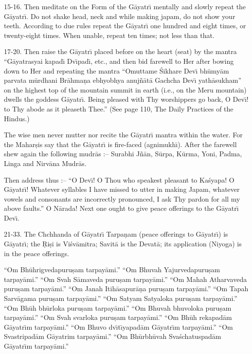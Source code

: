 15-16. Then meditate on the Form of the G\=ayatr\={\i} mentally and slowly repeat the G\=ayatr\={\i}. Do not shake head, neck and while making japam, do not show your teeth. According to due rules repeat the G\=ayatr\={\i} one hundred and eight times, or twenty-eight times. When unable, repeat ten times; not less than that.

17-20. Then raise the G\=ayatr\={\i} placed before on the heart (seat) by the mantra ``G\=ayatrasyai kapad\={\i} Dv\={\i}pad\={\i}, etc., and then bid farewell to Her after bowing down to Her and repeating the mantra ``Omuttame \'Sikhare Dev\={\i} bh\=umy\=am parvata m\=urdhani Br\=ahma\d{n}a ebhyobhya anuj\~n\=at\=a Gachcha Dev\={\i} yath\=asukham'' on the highest top of the mountain summit in earth (i.e., on the Meru mountain) dwells the goddess G\=ayatr\={\i}. Being pleased with Thy worshippers go back, O Dev\={\i}! to Thy abode as it pleaseth Thee.'' (See page 110, The Daily Practices of the Hindus.)

The wise men never mutter nor recite the G\=ayatr\={\i} mantra within the water. For the Mahar\d{s}is say that the G\=ayatr\={\i} is fire-faced (agnimukh\={\i}). After the farewell shew again the following mudr\=as :-- Surabhi J\~n\=an, S\=urpa, K\=urma, Yoni, Padma, Linga and Nirv\=ana Mudr\=as.

Then address thus :-- ``O Dev\={\i}! O Thou who speakest pleasant to Ka\'syapa! O G\=ayatr\={\i}! Whatever syllables I have missed to utter in making Japam, whatever vowels and consonants are incorrectly pronounced, I ask Thy pardon for all my above faults.'' O N\=arada! Next one ought to give peace offerings to the G\=ayatr\={\i} Dev\={\i}.

21-33. The Chchhanda of G\=ayatr\={\i} Tarpa\d{n}am (peace offerings to G\=ayatr\={\i}) is G\=ayatr\={\i}; the \d{R}i\d{s}i is Vi\'sv\=amitra; Savit\=a is the Devat\=a; its application (Niyoga) is in the peace offerings.

``Om Bh\=uhrigvedapuru\d{s}am tarpay\=ami.''
``Om Bhuvah Yajurvedapuru\d{s}am tarpay\=ami.''
``Om Svah S\=amaveda puru\d{s}am tarpay\=ami.''
``Om Mahah Atharvaveda puru\d{s}am tarpay\=ami.''
``Om Janah Itih\=asapur\=a\d{n}a puru\d{s}am tarpay\=ami.''
``Om Tapah Sarv\=agama puru\d{s}am tarpay\=ami.''
``Om Satyam Satyaloka puru\d{s}am tarpay\=ami.''
``Om Bh\=uh bh\=urloka puru\d{s}am tarpay\=ami.''
``Om Bhuvah bhuvoloka puru\d{s}am tarpay\=ami.''
``Om Svah svarloka puru\d{s}am tarpay\=ami.''
``Om Bh\=uh rekapad\=am G\=ayatr\={\i}m tarpay\=ami.''
``Om Bhuvo dv\={\i}t\={\i}yapad\=am G\=ayatr\={\i}m tarpay\=ami.''
``Om Svastripad\=am G\=ayatrim tarpay\=ami.''
``Om Bh\=urbh\=uvah Sva\'schatuspad\=am G\=ayatr\={\i}m tarpay\=ami.''


